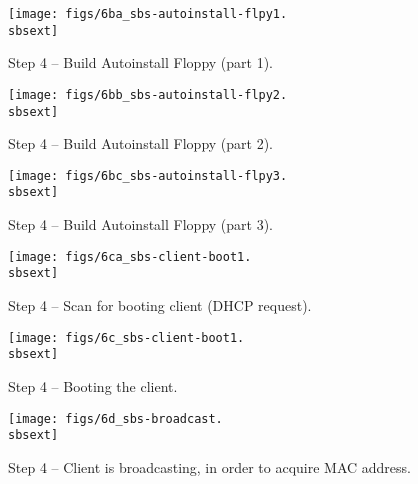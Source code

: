 \begin{figure}[htbp]
  \begin{center}
    \texttt{[image: figs/6ba\_sbs-autoinstall-flpy1.\\sbsext]}
    \caption{Step 4 -- Build Autoinstall Floppy (part 1).}
    \label{fig:sbs-autoinstall-flpy1}
  \end{center}
\end{figure}

\begin{figure}[htbp]
  \begin{center}
    \texttt{[image: figs/6bb\_sbs-autoinstall-flpy2.\\sbsext]}
    \caption{Step 4 -- Build Autoinstall Floppy (part 2).}
    \label{fig:sbs-autoinstall-flpy1}
  \end{center}
\end{figure}

\begin{figure}[htbp]
  \begin{center}
    \texttt{[image: figs/6bc\_sbs-autoinstall-flpy3.\\sbsext]}
    \caption{Step 4 -- Build Autoinstall Floppy (part 3).}
    \label{fig:sbs-autoinstall-flpy3}
  \end{center}
\end{figure}

\begin{figure}[htbp]
  \begin{center}
    \texttt{[image: figs/6ca\_sbs-client-boot1.\\sbsext]}
    \caption{Step 4 -- Scan for booting client (DHCP request).}
    \label{fig:sbs-collect-boot1}
  \end{center}
\end{figure}

\begin{figure}[htbp]
  \begin{center}
    \texttt{[image: figs/6c\_sbs-client-boot1.\\sbsext]}
    \caption{Step 4 -- Booting the client.}
    \label{fig:sbs-client-boot2}
  \end{center}
\end{figure}


\clearpage


\begin{figure}[htbp]
  \begin{center}
    \texttt{[image: figs/6d\_sbs-broadcast.\\sbsext]}
    \caption{Step 4 -- Client is broadcasting, in order to acquire MAC address.}
    \label{fig:sbs-collect-broadcast}
  \end{center}
\end{figure}

